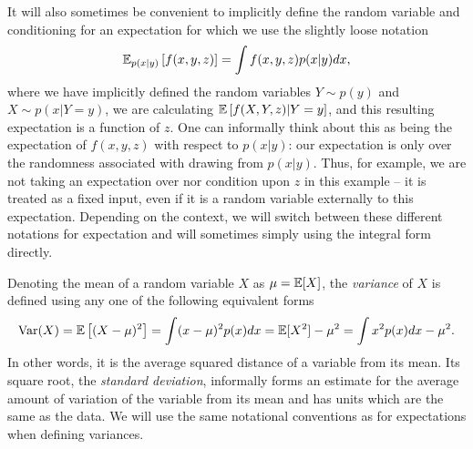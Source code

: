 It will also sometimes be convenient to implicitly define the random variable and conditioning for an 
expectation for which we use the slightly loose notation
\begin{align}
\label{eq:prob:expt-2}
\mathbb{E}_{p(x|y)} \left[f(x,y,z)\right] = \int f(x,y,z) p(x|y) dx,
\end{align}
where we have implicitly defined the random variables $Y \sim p(y)$ and $X \sim p(x | Y=y)$,
we are calculating $\mathbb{E} \left[f(X,Y,z) | Y=y\right]$,
and this resulting expectation is a function of $z$.  One can informally think about this
as being the expectation of $f(x,y,z)$ with respect to $p(x|y)$:
our expectation is only over the randomness associated with drawing from $p(x|y)$.  Thus,
for example, we are not taking an expectation over nor condition upon $z$ in this example
-- it is treated as a fixed input, even if it is a random variable externally to this expectation.
Depending on the context, we will switch between these different notations for expectation
and will sometimes simply using the integral form directly.

Denoting the mean of a random variable $X$ as $\mu=\mathbb{E} [X]$, the \emph{variance} of $X$
is defined using any one of the following equivalent forms
\begin{align}
\mathrm{Var} (X) = \mathbb{E} \left[(X-\mu)^2\right] = \int (x-\mu)^2 p(x)dx = \mathbb{E} [X^2] - \mu^2 =
\int x^2 p(x) dx - \mu^2.
\end{align}
In other words, it is the average squared distance of a variable from its mean.
Its square root, the \emph{standard deviation}, informally forms an estimate for the average
amount of variation of the variable from its mean and has units which are the same
as the data.  We will use the same notational conventions as for expectations when defining
variances.

